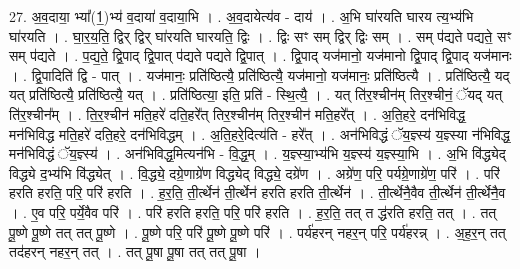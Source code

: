 \documentclass[17pt]{extarticle}
\begin{document}
27. अ॒व॒दाया॒ भ्या᳚(1॒)भ्य॑ व॒दाया॑ व॒दाया॒भि । . अ॒व॒दायेत्य॑व - दाय॑ । . अ॒भि घा॑रयति घारय त्य॒भ्य॑भि घा॑रयति । . घा॒र॒य॒ति॒ द्विर् द्विर् घा॑रयति घारयति॒ द्विः । . द्विः सꣳ सम् द्विर् द्विः सम् । . सम् प॑द्यते पद्यते॒ सꣳ सम् प॑द्यते । . प॒द्य॒ते॒ द्वि॒पाद् द्वि॒पात् प॑द्यते पद्यते द्वि॒पात् । . द्वि॒पाद् यज॑मानो॒ यज॑मानो द्वि॒पाद् द्वि॒पाद् यज॑मानः । . द्वि॒पादिति॑ द्वि - पात् । . यज॑मानः॒ प्रति॑ष्ठित्यै॒ प्रति॑ष्ठित्यै॒ यज॑मानो॒ यज॑मानः॒ प्रति॑ष्ठित्यै । . प्रति॑ष्ठित्यै॒ यद् यत् प्रति॑ष्ठित्यै॒ प्रति॑ष्ठित्यै॒ यत् । . प्रति॑ष्ठित्या॒ इति॒ प्रति॑ - स्थि॒त्यै॒ । . यत् ति॑र॒श्चीन॑म् तिर॒श्चीनं॒ ॅयद् यत् ति॑र॒श्चीन᳚म् । . ति॒र॒श्चीन॑ मति॒हरे॑ दति॒हरे᳚त् तिर॒श्चीन॑म् तिर॒श्चीन॑ मति॒हरे᳚त् । . अ॒ति॒हरे॒ दन॑भिविद्ध॒ मन॑भिविद्ध मति॒हरे॑ दति॒हरे॒ दन॑भिविद्धम् । . अ॒ति॒हरे॒दित्य॑ति - हरे᳚त् । . अन॑भिविद्धं ॅय॒ज्ञ्स्य॑ य॒ज्ञ्स्या न॑भिविद्ध॒ मन॑भिविद्धं ॅय॒ज्ञ्स्य॑ । . अन॑भिविद्ध॒मित्यन॑भि - वि॒द्ध॒म् । . य॒ज्ञ्स्या॒भ्य॑भि य॒ज्ञ्स्य॑ य॒ज्ञ्स्या॒भि । . अ॒भि वि॑द्ध्येद् विद्ध्ये द॒भ्य॑भि वि॑द्ध्येत् । . वि॒द्ध्ये॒ दग्रे॒णाग्रे॑ण विद्ध्येद् विद्ध्ये॒ दग्रे॑ण । . अग्रे॑ण॒ परि॒ पर्यग्रे॒णाग्रे॑ण॒ परि॑ । . परि॑ हरति हरति॒ परि॒ परि॑ हरति । . ह॒र॒ति॒ ती॒र्त्थेन॑ ती॒र्त्थेन॑ हरति हरति ती॒र्त्थेन॑ । . ती॒र्त्थेनै॒वैव ती॒र्त्थेन॑ ती॒र्त्थेनै॒व । . ए॒व परि॒ पर्ये॒वैव परि॑ । . परि॑ हरति हरति॒ परि॒ परि॑ हरति । . ह॒र॒ति॒ तत् त द्ध॑रति हरति॒ तत् । . तत् पू॒ष्णे पू॒ष्णे तत् तत् पू॒ष्णे । . पू॒ष्णे परि॒ परि॑ पू॒ष्णे पू॒ष्णे परि॑ । . पर्य॑हरन् नहर॒न् परि॒ पर्य॑हरन्न् । . अ॒ह॒र॒न् तत् तद॑हरन् नहर॒न् तत् । . तत् पू॒षा पू॒षा तत् तत् पू॒षा । \newline
\end{document}
